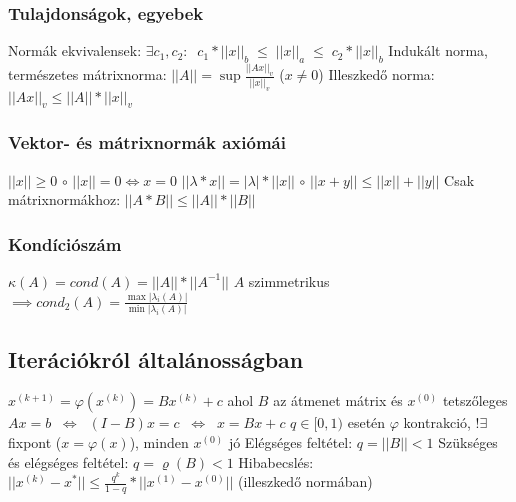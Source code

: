 \documentclass[12pt,a4paper]{article}
\begin{document}
\subsubsection{Tulajdonságok, egyebek}

\begin{outline}
	\1 Normák ekvivalensek: $\exists c_1,c_2: \;\; c_1*||x||_b \;\le\; ||x||_a \;\le\; c_2*||x||_b$
	\1 Indukált norma, természetes mátrixnorma: $||A|| = \sup \frac{||Ax||_v}{||x||_v}$ \; ($x \ne 0$)
	\1 Illeszkedő norma: $||Ax||_v \le ||A|| * ||x||_v$

\end{outline}

\subsubsection{Vektor- és mátrixnormák axiómái}

\begin{outline}
	\1 $||x|| \ge 0$
	\;\;\;\;\;\;\;\;\;\;\;\;\;\;\;\;\;\;\;\;\;\;\;\;
	$\circ$ $||x|| = 0 \Leftrightarrow x = 0$
	\1 $||\lambda * x|| = |\lambda| * ||x||$
	\;\;\;\;\;\;\;
	$\circ$ $||x+y|| \le ||x|| + ||y||$
	\1 Csak mátrixnormákhoz: $||A*B|| \le ||A|| * ||B||$
\end{outline}

\subsubsection{Kondíciószám}

\begin{outline}
	\1 $\kappa(A) = cond(A) = ||A||*||A^{-1}||$
	\1 $A$ szimmetrikus $\implies cond_2(A) = \frac{\max |\lambda_i (A)|}{\min |\lambda_i (A)|}$
\end{outline}

\pagebreak

\subsection{Iterációkról általánosságban}

\begin{outline}
	\1 $x^{(k+1)} = \varphi(x^{(k)}) = B x^{(k)} + c$ ahol $B$ az átmenet mátrix és $x^{(0)}$ tetszőleges
	\1 $Ax=b \;\;\Leftrightarrow\;\; (I-B)x = c \;\;\Leftrightarrow\;\; x = Bx+c$
	\1 $q \in [0,1)$ esetén $\varphi$ kontrakció, $! \exists$ fixpont ($x=\varphi(x)$), minden $x^{(0)}$ jó
	\1 Elégséges feltétel: $q = ||B|| < 1$
	\1 Szükséges és elégséges feltétel: $q = \varrho(B) < 1$
	\1 Hibabecslés: $||x^{(k)} - x^*|| \le \frac{q^k}{1-q} * ||x^{(1)} - x^{(0)}||$ \;\; (illeszkedő normában)
\end{outline}
\end{document}
